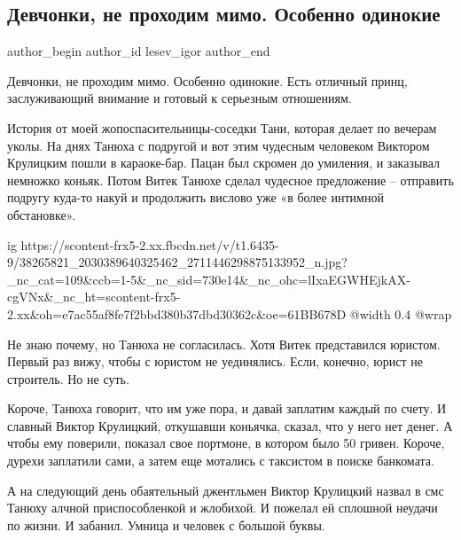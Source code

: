  
 
 
 
 
 
\subsection{Девчонки, не проходим мимо. Особенно одинокие}
\label{sec:03_08_2018.fb.lesev_igor.1.devchonki_princ}
 
\ifcmt
 author_begin
   author_id lesev_igor
 author_end
\fi

Девчонки, не проходим мимо. Особенно одинокие. Есть отличный принц,
заслуживающий внимание и готовый к серьезным отношениям.

История от моей жопоспасительницы-соседки Тани, которая делает по вечерам
уколы. На днях Танюха с подругой и вот этим чудесным человеком Виктором
Крулицким пошли в караоке-бар. Пацан был скромен до умиления, и заказывал
немножко коньяк. Потом Витек Танюхе сделал чудесное предложение – отправить
подругу куда-то накуй и продолжить вислово уже «в более интимной обстановке».

\ifcmt
  ig https://scontent-frx5-2.xx.fbcdn.net/v/t1.6435-9/38265821_2030389640325462_2711446298875133952_n.jpg?_nc_cat=109&ccb=1-5&_nc_sid=730e14&_nc_ohc=lIxaEGWHEjkAX-cgVNx&_nc_ht=scontent-frx5-2.xx&oh=e7ac55af8fe7f2bbd380b37dbd30362c&oe=61BB678D
  @width 0.4
  @wrap 
\fi

Не знаю почему, но Танюха не согласилась. Хотя Витек представился юристом.
Первый раз вижу, чтобы с юристом не уединялись. Если, конечно, юрист не
строитель. Но не суть.

Короче, Танюха говорит, что им уже пора, и давай заплатим каждый по счету. И
славный Виктор Крулицкий, откушавши коньячка, сказал, что у него нет денег. А
чтобы ему поверили, показал свое портмоне, в котором было 50 гривен. Короче,
дурехи заплатили сами, а затем еще мотались с таксистом в поиске банкомата.

А на следующий день обаятельный джентльмен Виктор Крулицкий назвал в смс Танюху
алчной приспособленкой и жлобихой. И пожелал ей сплошной неудачи по жизни. И
забанил. Умница и человек с большой буквы.

